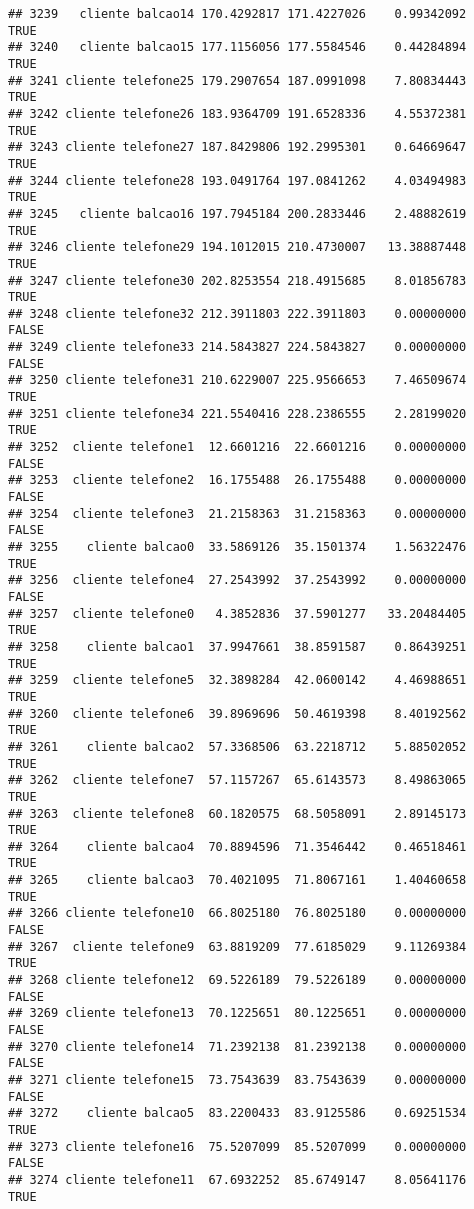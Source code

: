 \documentclass[
]{article}
\begin{document}
\begin{verbatim}
## 3239   cliente balcao14 170.4292817 171.4227026    0.99342092     TRUE
## 3240   cliente balcao15 177.1156056 177.5584546    0.44284894     TRUE
## 3241 cliente telefone25 179.2907654 187.0991098    7.80834443     TRUE
## 3242 cliente telefone26 183.9364709 191.6528336    4.55372381     TRUE
## 3243 cliente telefone27 187.8429806 192.2995301    0.64669647     TRUE
## 3244 cliente telefone28 193.0491764 197.0841262    4.03494983     TRUE
## 3245   cliente balcao16 197.7945184 200.2833446    2.48882619     TRUE
## 3246 cliente telefone29 194.1012015 210.4730007   13.38887448     TRUE
## 3247 cliente telefone30 202.8253554 218.4915685    8.01856783     TRUE
## 3248 cliente telefone32 212.3911803 222.3911803    0.00000000    FALSE
## 3249 cliente telefone33 214.5843827 224.5843827    0.00000000    FALSE
## 3250 cliente telefone31 210.6229007 225.9566653    7.46509674     TRUE
## 3251 cliente telefone34 221.5540416 228.2386555    2.28199020     TRUE
## 3252  cliente telefone1  12.6601216  22.6601216    0.00000000    FALSE
## 3253  cliente telefone2  16.1755488  26.1755488    0.00000000    FALSE
## 3254  cliente telefone3  21.2158363  31.2158363    0.00000000    FALSE
## 3255    cliente balcao0  33.5869126  35.1501374    1.56322476     TRUE
## 3256  cliente telefone4  27.2543992  37.2543992    0.00000000    FALSE
## 3257  cliente telefone0   4.3852836  37.5901277   33.20484405     TRUE
## 3258    cliente balcao1  37.9947661  38.8591587    0.86439251     TRUE
## 3259  cliente telefone5  32.3898284  42.0600142    4.46988651     TRUE
## 3260  cliente telefone6  39.8969696  50.4619398    8.40192562     TRUE
## 3261    cliente balcao2  57.3368506  63.2218712    5.88502052     TRUE
## 3262  cliente telefone7  57.1157267  65.6143573    8.49863065     TRUE
## 3263  cliente telefone8  60.1820575  68.5058091    2.89145173     TRUE
## 3264    cliente balcao4  70.8894596  71.3546442    0.46518461     TRUE
## 3265    cliente balcao3  70.4021095  71.8067161    1.40460658     TRUE
## 3266 cliente telefone10  66.8025180  76.8025180    0.00000000    FALSE
## 3267  cliente telefone9  63.8819209  77.6185029    9.11269384     TRUE
## 3268 cliente telefone12  69.5226189  79.5226189    0.00000000    FALSE
## 3269 cliente telefone13  70.1225651  80.1225651    0.00000000    FALSE
## 3270 cliente telefone14  71.2392138  81.2392138    0.00000000    FALSE
## 3271 cliente telefone15  73.7543639  83.7543639    0.00000000    FALSE
## 3272    cliente balcao5  83.2200433  83.9125586    0.69251534     TRUE
## 3273 cliente telefone16  75.5207099  85.5207099    0.00000000    FALSE
## 3274 cliente telefone11  67.6932252  85.6749147    8.05641176     TRUE

\end{verbatim}
\end{document}
